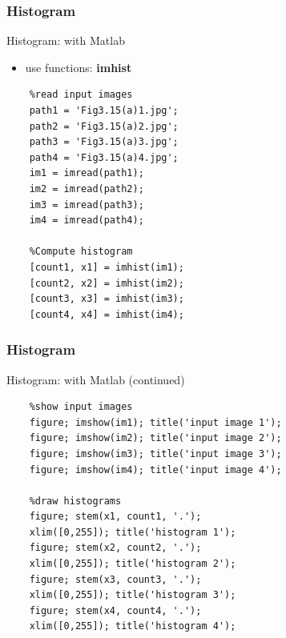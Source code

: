 \documentclass[english,11pt,table,handout]{beamer}
\begin{document}
\begin{frame}[fragile]
\frametitle{Histogram}
\begin{block}{Histogram: with Matlab}
	\begin{itemize}
		\item use functions: \textbf{imhist}
	\end{itemize}
	\begin{lstlisting}
	%read input images
	path1 = 'Fig3.15(a)1.jpg';
	path2 = 'Fig3.15(a)2.jpg';
	path3 = 'Fig3.15(a)3.jpg';
	path4 = 'Fig3.15(a)4.jpg';
	im1 = imread(path1); 
	im2 = imread(path2); 
	im3 = imread(path3); 
	im4 = imread(path4); 
	
	%Compute histogram
	[count1, x1] = imhist(im1);
	[count2, x2] = imhist(im2);
	[count3, x3] = imhist(im3);
	[count4, x4] = imhist(im4);
	\end{lstlisting}
\end{block}
\end{frame}

\begin{frame}[fragile]
\frametitle{Histogram}
\begin{block}{Histogram: with Matlab (continued)}
	\begin{lstlisting}
	%show input images
	figure; imshow(im1); title('input image 1');
	figure; imshow(im2); title('input image 2');
	figure; imshow(im3); title('input image 3');
	figure; imshow(im4); title('input image 4');
	
	%draw histograms
	figure; stem(x1, count1, '.'); 
	xlim([0,255]); title('histogram 1');
	figure; stem(x2, count2, '.'); 
	xlim([0,255]); title('histogram 2');
	figure; stem(x3, count3, '.'); 
	xlim([0,255]); title('histogram 3');
	figure; stem(x4, count4, '.'); 
	xlim([0,255]); title('histogram 4');
	\end{lstlisting}
\end{block}
\end{frame}
\end{document}
